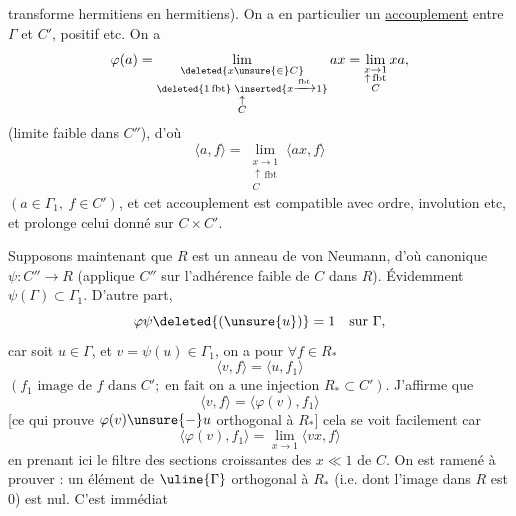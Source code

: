 transforme hermitiens en hermitiens). On a en particulier un \uline{accouplement} entre \(\Gamma\) et \(C'\), positif etc. On a
\[
\varphi(a)=\lim_{\substack{\deleted{x\unsure{\in} C}\\\deleted{1\,\mathrm{fbt}}\;\inserted{x\xrightarrow{\mathrm{fbt}}1}\\\uparrow\\C}}ax
=\lim_{\substack{x\to1\\\uparrow\,\mathrm{fbt}\\C}}xa,
\]
(limite faible dans \(C''\)), d'où 
\[
\langle a,f\rangle=\lim_{\substack{x\to1\\\uparrow\,\mathrm{fbt}\\C}}\langle ax,f\rangle
\]
\((a\in\Gamma_1,\ f\in C')\), et cet accouplement est compatible avec ordre, involution etc, et prolonge celui donné sur \(C\times C'\).

Supposons maintenant que \(R\) est un anneau de von Neumann, d'où canonique \(\psi:C''\to R\) (applique \(C''\) sur l'adhérence faible de \(C\) dans \(R\)). Évidemment \(\psi(\Gamma)\subset\Gamma_1\). D'autre part,
\[
\varphi\psi\deleted{(\unsure{u})}=1\quad\text{sur }\Gamma,
\]
car soit \(u\in\Gamma\),  et \(v=\psi(u)\in\Gamma_1\), on a pour \(\forall f\in R_*\)
\[
\langle v,f\rangle=\langle u,f_1\rangle
\]
\((f_1\text{ image de }f\text{ dans }C';\;\text{en fait on a une injection }R_*\subset C')\).
J'affirme que
\[
\langle v,f\rangle=\langle\varphi(v),f_1\rangle
\]
[ce qui prouve  \(\varphi(v)\unsure{-}u\) orthogonal à \(R_*\)] cela se voit facilement car
\[
\langle\varphi(v),f_1\rangle=\lim_{x\to1}\langle vx,f\rangle
\]
en prenant ici le filtre des sections croissantes des  \(x\ll1\) de \(C\). On est ramené à prouver : un élément de \(\uline{\Gamma}\) orthogonal à \(R_*\)  (i.e. dont l'image dans \(R\) est \(0\)) est nul. C'est immédiat

